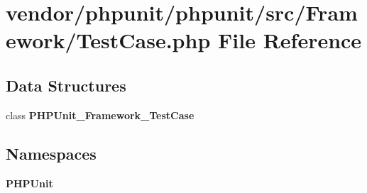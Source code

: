 \section{vendor/phpunit/phpunit/src/\+Framework/\+Test\+Case.php File Reference}
\label{vendor_2phpunit_2phpunit_2src_2_framework_2_test_case_8php}
\subsection*{Data Structures}
\begin{DoxyCompactItemize}
\item 
class {\bf P\+H\+P\+Unit\+\_\+\+Framework\+\_\+\+Test\+Case}
\end{DoxyCompactItemize}
\subsection*{Namespaces}
\begin{DoxyCompactItemize}
\item 
 {\bf P\+H\+P\+Unit}
\end{DoxyCompactItemize}
